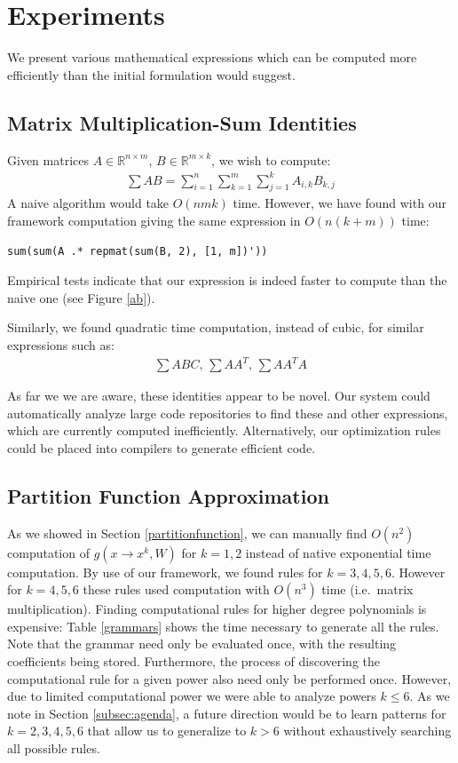 \section{Experiments}

We present various mathematical expressions which can be computed more efficiently
than the initial formulation would suggest. 

\subsection{Matrix Multiplication-Sum Identities}

Given matrices $A \in \mathbb{R}^{n \times m}$, $B \in \mathbb{R}^{m
  \times k}$, we wish to compute:
\begin{gather*}
\sum AB = \sum_{i = 1}^n \sum_{k = 1}^m \sum_{j = 1}^k A_{i, k} B_{k, j} 
\end{gather*}
A naive algorithm would take $O(nmk)$ time. However, we have found with our framework 
computation giving the same expression in $O(n(k + m))$ time:
\begin{lstlisting}
sum(sum(A .* repmat(sum(B, 2), [1, m])'))
\end{lstlisting}
Empirical tests indicate that our expression is indeed faster to
compute than the naive one (see Figure \ref{ab}).

Similarly, we found quadratic time computation, instead of cubic, for
similar expressions such as: 
\begin{align*}
	\sum ABC\text{, }\sum AA^T\text{, }\sum AA^TA
\end{align*}

As far we we are aware, these identities appear to be novel. Our
system could automatically analyze large code repositories to find
these and other expressions, which are currently computed
inefficiently. Alternatively, our optimization rules could be placed
into compilers to generate efficient code.

\subsection{Partition Function Approximation}

As we showed in Section \ref{partitionfunction}, we can manually find
$O(n^2)$ computation of $g(x \rightarrow x^k, W)$ for $k = 1, 2$
instead of native exponential time computation. By use of our
framework, we found rules for $k = 3, 4, 5, 6$. However for $k = 4, 5, 6$
these rules used computation with $O(n^3)$ time (i.e.~matrix
multiplication). Finding computational rules for higher degree
polynomials is expensive: Table \ref{grammars} shows the time
necessary to generate all the rules. Note that the grammar
need only be evaluated once, with the resulting coefficients being
stored. Furthermore, the process of discovering the computational rule
for a given power also need only be performed once. However, due to limited computational
power we were able to analyze powers $k \leq 6$. As we note in Section
\ref{subsec:agenda}, a future direction would be to learn patterns for
$k=2, 3, 4, 5, 6$ that allow us to generalize to $k>6$ without exhaustively
searching all possible rules. 


